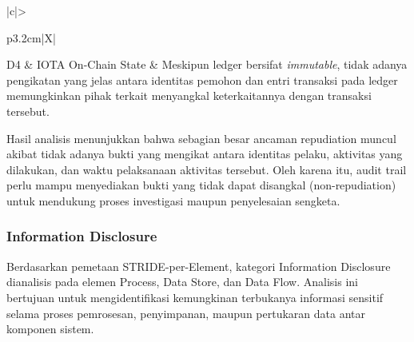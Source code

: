 \begin{xltabular}{\textwidth}{|c|>{\raggedright\arraybackslash}p{3.2cm}|X|}
    D4 &
    IOTA On-Chain State &
    Meskipun ledger bersifat \textit{immutable}, tidak adanya pengikatan yang jelas antara identitas pemohon dan entri transaksi pada ledger memungkinkan pihak terkait menyangkal keterkaitannya dengan transaksi tersebut. \\
    \hline

\end{xltabular}

Hasil analisis menunjukkan bahwa sebagian besar ancaman repudiation muncul akibat tidak adanya bukti yang mengikat antara identitas pelaku, aktivitas yang dilakukan, dan waktu pelaksanaan aktivitas tersebut. Oleh karena itu, audit trail perlu mampu menyediakan bukti yang tidak dapat disangkal (non-repudiation) untuk mendukung proses investigasi maupun penyelesaian sengketa.

\subsubsection{Information Disclosure}

Berdasarkan pemetaan STRIDE-per-Element, kategori Information Disclosure dianalisis pada elemen Process, Data Store, dan Data Flow. Analisis ini bertujuan untuk mengidentifikasi kemungkinan terbukanya informasi sensitif selama proses pemrosesan, penyimpanan, maupun pertukaran data antar komponen sistem.

